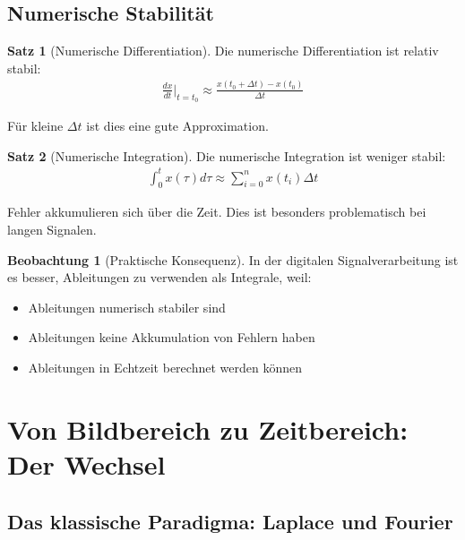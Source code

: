 ﻿\documentclass[a4paper,12pt]{report}
\theoremstyle{definition}
\newtheorem{satz}{Satz}
\newtheorem{beobachtung}{Beobachtung}
\begin{document}
	\subsection{Numerische Stabilität}
	
	\begin{satz}[Numerische Differentiation]
		Die numerische Differentiation ist relativ stabil:
		\begin{align}
			\frac{dx}{dt}\bigg|_{t=t_0} \approx \frac{x(t_0 + \Delta t) - x(t_0)}{\Delta t}
		\end{align}
		
		Für kleine $\Delta t$ ist dies eine gute Approximation.
	\end{satz}
	
	\begin{satz}[Numerische Integration]
		Die numerische Integration ist weniger stabil:
		\begin{align}
			\int_0^t x(\tau) d\tau \approx \sum_{i=0}^{n} x(t_i) \Delta t
		\end{align}
		
		Fehler akkumulieren sich über die Zeit. Dies ist besonders problematisch bei langen Signalen.
	\end{satz}
	
	\begin{beobachtung}[Praktische Konsequenz]
		In der digitalen Signalverarbeitung ist es besser, Ableitungen zu verwenden als Integrale, weil:
		\begin{itemize}
			\item[-] Ableitungen numerisch stabiler sind
			\item[-] Ableitungen keine Akkumulation von Fehlern haben
			\item[-] Ableitungen in Echtzeit berechnet werden können
		\end{itemize}
	\end{beobachtung}
	
	\section{Von Bildbereich zu Zeitbereich: Der Wechsel}
	
	\subsection{Das klassische Paradigma: Laplace und Fourier}
	
\end{document}
